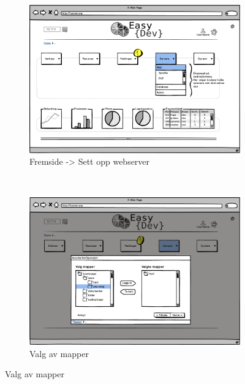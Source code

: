 \begin{figure}[p]
        \centering
        \begin{subfigure}[b]{0.48\textwidth}
                \includegraphics[width=\textwidth]
                {./img/prosessdokumentasjon/lowfi/apache1.png}
                \caption{Fremside -> Sett opp webserver}
                \label{fig:apache1}
        \end{subfigure}%
        ~ %
        \begin{subfigure}[b]{0.48\textwidth}
                \includegraphics[width=\textwidth]
                {./img/prosessdokumentasjon/lowfi/apache2.png}
                \caption{Valg av mapper}
                \label{fig:apache2}
        \end{subfigure}
       

\end{figure}
